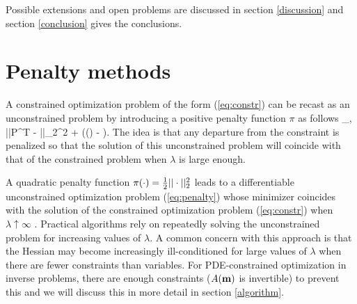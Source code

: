 \documentclass{iopart}
\begin{document}
Possible extensions and open problems are discussed in section
\ref{discussion} and section \ref{conclusion} gives the conclusions.


\section{Penalty methods}
\label{penalty}
A constrained optimization problem of the form (\ref{eq:constr})
can be recast as an unconstrained problem by introducing a positive penalty function $\pi$ as follows
\bq
\label{eq:penalty}
\min_{,} ||P^T - ||_2^2 + \lambda\pi(() - ).
\eq
The idea is that any departure from the constraint is penalized so that the solution of this 
unconstrained problem will coincide with that of the constrained problem when $\lambda$ is large enough.

A quadratic penalty function $\pi(\cdot) = {\textstyle\frac{1}{2}}||\cdot||_2^2$ leads to a differentiable 
unconstrained optimization problem (\ref{eq:penalty}) whose minimizer coincides with the solution
of the constrained optimization problem (\ref{eq:constr}) when $\lambda \uparrow \infty$ \cite[Thm. 17.1]{Nocedal}. 
Practical algorithms rely on repeatedly solving the unconstrained problem for increasing values of $\lambda$.
A common concern with this approach is that the Hessian may become increasingly ill-conditioned 
for large values of $\lambda$ when there are fewer constraints than variables. For PDE-constrained 
optimization in inverse problems, there are enough constraints ($A(\mathbf{m})$ is invertible) to prevent this and we will
discuss this in more detail in section \ref{algorithm}.
\end{document}
